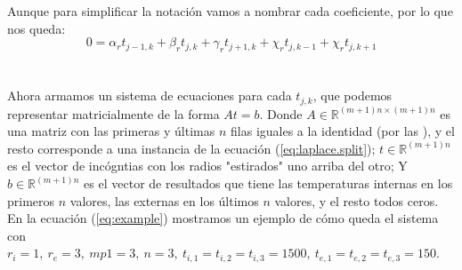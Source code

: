 \documentclass[12pt]{article}
\newcommand{\sub}[3]{\ensuremath{#1_{#2,#3}}}
\begin{document}
Aunque para simplificar la notación vamos a nombrar cada coeficiente, por lo que nos queda: \\ %
\begin{equation}
\label{eq:laplace.split}
0 = \alpha_r\sub{t}{j-1}{k} + \beta_r\sub{t}{j}{k} + \gamma_r\sub{t}{j+1}{k} + \chi_r\sub{t}{j}{k-1} + \chi_r\sub{t}{j}{k+1}
\end{equation}\\


\paragraph{} Ahora armamos un sistema de ecuaciones para cada \(\sub{t}{j}{k}\), que podemos representar matricialmente de la forma \(At = b\). Donde \(A \in \mathbb{R}^{(m+1)n \times (m+1)n}\) es una matriz con las primeras y últimas \(n\) filas iguales a la identidad (por las ), y el resto corresponde a una instancia de la ecuación (\ref{eq:laplace.split}); \(t \in \mathbb{R}^{(m+1)n}\) es el vector de incógntias con los radios "estirados" uno arriba del otro; Y  \(b \in \mathbb{R}^{(m+1)n}\) es el vector de resultados que tiene las temperaturas internas en los primeros \(n\) valores, las externas en los últimos \(n\) valores, y el resto todos ceros. \\
En la ecuación (\ref{eq:example}) mostramos un ejemplo de cómo queda el sistema con \(r_i = 1,\ r_e = 3,\ mp1 = 3,\ n = 3,\ \sub{t}{i}{1} = \sub{t}{i}{2} = \sub{t}{i}{3} = 1500,\ \sub{t}{e}{1} = \sub{t}{e}{2} = \sub{t}{e}{3} = 150\).
\end{document}
